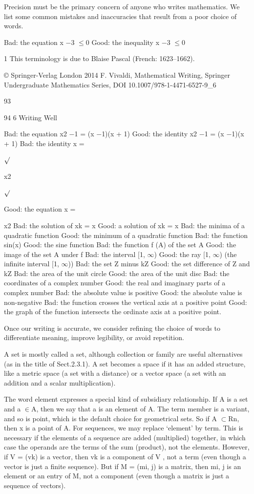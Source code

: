 \documentclass[11pt]{article}
\theoremstyle{plain}
\theoremstyle{definition}
\begin{document}
Precision must be the primary concern of anyone who writes mathematics. We list some common mistakes and inaccuracies that result from a poor choice of words.

Bad: the equation x $-$3 $\leq$0 Good: the inequality x $-$3 $\leq$0

1 This terminology is due to Blaise Pascal (French: 1623--1662).

© Springer-Verlag London 2014 F. Vivaldi, Mathematical Writing, Springer Undergraduate Mathematics Series, DOI 10.1007/978-1-4471-6527-9\_6

93

94 6 Writing Well

Bad: the equation x2 $-$1 = (x $-$1)(x + 1) Good: the identity x2 $-$1 = (x $-$1)(x + 1) Bad: the identity x =

$\surd$

x2

$\surd$

Good: the equation x =

x2 Bad: the solution of xk = x Good: a solution of xk = x Bad: the minima of a quadratic function Good: the minimum of a quadratic function Bad: the function sin(x) Good: the sine function Bad: the function f (A) of the set A Good: the image of the set A under f Bad: the interval [1, $\infty$) Good: the ray [1, $\infty$) (the infinite interval [1, $\infty$)) Bad: the set Z minus kZ Good: the set difference of Z and kZ Bad: the area of the unit circle Good: the area of the unit disc Bad: the coordinates of a complex number Good: the real and imaginary parts of a complex number Bad: the absolute value is positive Good: the absolute value is non-negative Bad: the function crosses the vertical axis at a positive point Good: the graph of the function intersects the ordinate axis at a positive point.

Once our writing is accurate, we consider refining the choice of words to differentiate meaning, improve legibility, or avoid repetition.

A set is mostly called a set, although collection or family are useful alternatives (as in the title of Sect.2.3.1). A set becomes a space if it has an added structure, like a metric space (a set with a distance) or a vector space (a set with an addition and a scalar multiplication).

The word element expresses a special kind of subsidiary relationship. If A is a set and a $\in$A, then we say that a is an element of A. The term member is a variant, and so is point, which is the default choice for geometrical sets. So if A $\subset$Rn, then x is a point of A. For sequences, we may replace `element' by term. This is necessary if the elements of a sequence are added (multiplied) together, in which case the operands are the terms of the sum (product), not the elements. However, if V = (vk) is a vector, then vk is a component of V , not a term (even though a vector is just a finite sequence). But if M = (mi, j) is a matrix, then mi, j is an element or an entry of M, not a component (even though a matrix is just a sequence of vectors).
\end{document}
